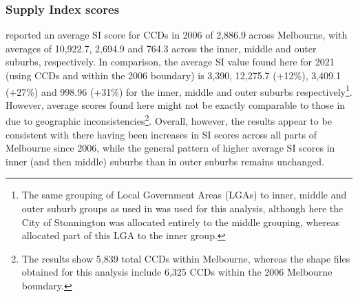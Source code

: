 \documentclass[preprint, 3p,
authoryear]{elsarticle} %
\begin{document}
\subsubsection{Supply Index scores}\label{supply-index-scores}

\citet{currie2010identifying} reported an average SI score for CCDs in
2006 of 2,886.9 across Melbourne, with averages of 10,922.7, 2,694.9 and
764.3 across the inner, middle and outer suburbs, respectively. In
comparison, the average SI value found here for 2021 (using CCDs and
within the 2006 boundary) is 3,390, 12,275.7 (+12\%), 3,409.1 (+27\%)
and 998.96 (+31\%) for the inner, middle and outer suburbs
respectively\footnote{The same grouping of Local Government Areas (LGAs)
  to inner, middle and outer suburb groups as used in
  \citet{currie2010identifying} was used for this analysis, although
  here the City of Stonnington was allocated entirely to the middle
  grouping, whereas \citet{currie2010identifying} allocated part of this
  LGA to the inner group.}. However, average scores found here might not
be exactly comparable to those in \citet{currie2010identifying} due to
geographic inconsistencies\footnote{The \citet{currie2010identifying}
  results show 5,839 total CCDs within Melbourne, whereas the shape
  files obtained for this analysis include 6,325 CCDs within the 2006
  Melbourne boundary.}. Overall, however, the results appear to be
consistent with there having been increases in SI scores across all
parts of Melbourne since 2006, while the general pattern of higher
average SI scores in inner (and then middle) suburbs than in outer
suburbs remains unchanged.
\end{document}
